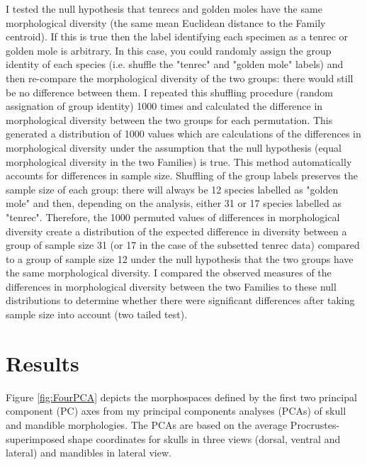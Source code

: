 	I tested the null hypothesis that tenrecs and golden moles have the same morphological diversity (the same mean Euclidean distance to the Family centroid). If this is true then the label identifying each specimen as a tenrec or golden mole is arbitrary. In this case, you could randomly assign the group identity of each species (i.e. shuffle the "tenrec" and "golden mole" labels) and then re-compare the morphological diversity of the two groups: there would still be no difference between them. I repeated this shuffling procedure (random assignation of group identity) 1000 times and calculated the difference in morphological diversity between the two groups for each permutation. This generated a distribution of 1000 values which are calculations of the differences in morphological diversity under the assumption that the null hypothesis (equal morphological diversity in the two Families) is true. This method automatically accounts for differences in sample size. Shuffling of the group labels preserves the sample size of each group: there will always be 12 species labelled as "golden mole" and then, depending on the analysis, either 31 or 17 species labelled as "tenrec". Therefore, the 1000 permuted values of differences in morphological diversity create a distribution of the expected difference in diversity between a group of sample size 31 (or 17 in the case of the subsetted tenrec data) compared to a group of sample size 12 under the null hypothesis that the two groups have the same morphological diversity. I compared the observed measures of the differences in morphological diversity between the two Families to these null distributions to determine whether there were significant differences after taking sample size into account (two tailed test).

	
\newpage
\section{Results}
\label{sect:results}

	Figure \ref{fig:FourPCA} depicts the morphospaces defined by the first two principal component (PC) axes from my principal components analyses (PCAs) of skull and mandible morphologies. The PCAs are based on the average Procrustes-superimposed shape coordinates for skulls in three views (dorsal, ventral and lateral) and mandibles in lateral view.

